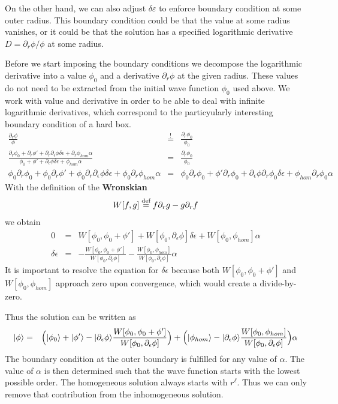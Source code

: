 \documentclass[11pt,a4paper]{report}
\begin{document}
On the other hand, we can also adjust $\delta\varepsilon$ to enforce
boundary condition at some outer radius. This boundary condition could
be that the value at some radius vanishes, or it could be that the
solution has a specified logarithmic derivative
$D=\partial_r\phi/\phi$ at some radius.

Before we start imposing the boundary conditions we decompose the
logarithmic derivative into a value $\phi_0$ and a derivative
$\partial_r\phi$ at the given radius. These values do not need to be
extracted from the initial wave function $\phi_0$ used above. We work
with value and derivative in order to be able to deal with infinite
logarithmic derivatives, which correspond to the particyularly
interesting boundary condition of a hard box.
\begin{eqnarray*}
\frac{\partial_r\phi}{\phi}&\stackrel{!}{=}&\frac{\partial_r\phi_0}{\phi_0}
\\
\frac{\partial_r\phi_0+\partial_r\phi\prime
+\partial_r\partial_\epsilon\phi\delta\epsilon
+\partial_r\phi_{hom}\alpha}
{\phi_0+\phi\prime+\partial_\epsilon\phi\delta\epsilon+\phi_{hom}\alpha}
&=&\frac{\partial_r\phi_0}{\phi_0}
\\
\phi_0\partial_r\phi_0+\phi_0\partial_r\phi\prime
+\phi_0\partial_r\partial_\epsilon\phi\delta\epsilon
+\phi_0\partial_r\phi_{hom}\alpha
&=&
\phi_0\partial_r\phi_0+\phi\prime\partial_r\phi_0
+\partial_\epsilon\phi\partial_r\phi_0\delta\epsilon+\phi_{hom}\partial_r\phi_0 \alpha
\end{eqnarray*}
With the definition of the \textbf{Wronskian}
\begin{eqnarray*}
W[f,g]\stackrel{\text{def}}{=} f\partial_r g-g\partial_r f
\end{eqnarray*}
we obtain
\begin{eqnarray*}
0&=&W[\phi_0,\phi_0+\phi']
+W[\phi_0,\partial_\epsilon\phi]\delta \epsilon
+W[\phi_0,\phi_{hom}]\alpha
\\
\delta\epsilon&=&
-\frac{W[\phi_0,\phi_0+\phi']}{W[\phi_0,\partial_\epsilon\phi]}
-\frac{W[\phi_0,\phi_{hom}]}{W[\phi_0,\partial_\epsilon\phi]}\alpha
\end{eqnarray*}
It is important to resolve the equation for $\delta\epsilon$ because
both $W[\phi_0,\phi_0+\phi']$ and $W[\phi_0,\phi_{hom}]$ approach zero
upon convergence, which would create a divide-by-zero.

Thus the solution can be written as
\begin{eqnarray*}
|\phi\rangle&=&
\Bigl(|\phi_0\rangle+|\phi'\rangle-|\partial_\epsilon\phi\rangle
\frac{W[\phi_0,\phi_0+\phi']}{W[\phi_0,\partial_\epsilon\phi]}\Bigr)
+\Bigl(|\phi_{hom}\rangle-|\partial_\epsilon\phi\rangle
\frac{W[\phi_0,\phi_{hom}]}{W[\phi_0,\partial_\epsilon\phi]}\Bigr)\alpha
\end{eqnarray*}
The boundary condition at the outer boundary is fulfilled for any
value of $\alpha$. The value of $\alpha$ is then determined such that
the wave function starts with the lowest possible order. The
homogeneous solution always starts with $r^\ell$. Thus we can only
remove that contribution from the inhomogeneous solution.
\end{document}
